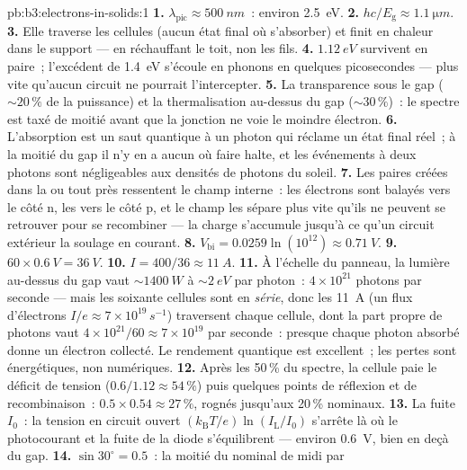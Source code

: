 \begin{solution}{pb:b3:electrons-in-solids:1}
\textbf{1.} $\lambda_{\text{pic}} \approx \qty{500}{nm}$~:
environ \qty{2.5}{eV}.
\textbf{2.} $hc/E_{\text{g}} \approx \qty{1.1}{\micro m}$.
\textbf{3.} Elle traverse les cellules (aucun état final où
s'absorber) et finit en chaleur dans le support --- en réchauffant
le toit, non les fils.
\textbf{4.} $\qty{1.12}{eV}$ survivent en paire~; l'excédent de
\qty{1.4}{eV} s'écoule en phonons en quelques picosecondes --- plus
vite qu'aucun circuit ne pourrait l'intercepter.
\textbf{5.} La transparence sous le gap ($\sim20\,\%$ de la
puissance) et la thermalisation au-dessus du gap
($\sim30\,\%$)~: le spectre est taxé de moitié avant que la jonction
ne voie le moindre électron.
\textbf{6.} L'absorption est un saut quantique à un photon qui
réclame un état final réel~; à la moitié du gap il n'y en a aucun où
faire halte, et les événements à deux photons sont négligeables aux
densités de photons du soleil.
\textbf{7.} Les paires créées dans la  ou tout près
ressentent le champ interne~: les électrons sont balayés vers le
côté n, les  vers le côté p, et le champ les sépare plus vite
qu'ils ne peuvent se retrouver pour se recombiner --- la charge
s'accumule jusqu'à ce qu'un circuit extérieur la soulage en courant.
\textbf{8.} $V_{\text{bi}} = 0.0259\ln(10^{12}) \approx
\qty{0.71}{V}$.
\textbf{9.} $60\times\qty{0.6}{V} = \qty{36}{V}$.
\textbf{10.} $I = 400/36 \approx \qty{11}{A}$.
\textbf{11.} À l'échelle du panneau, la lumière au-dessus du gap
vaut $\sim\qty{1400}{W}$ à $\sim\qty{2}{eV}$ par photon~:
$4\times10^{21}$ photons par seconde --- mais les soixante cellules
sont en \emph{série}, donc les \qty{11}{A} (un flux d'électrons $I/e \approx
7\times10^{19}\,\unit{s^{-1}}$) traversent chaque cellule, dont la
part propre de photons vaut $4\times10^{21}/60 \approx
7\times10^{19}$ par seconde~: presque chaque photon absorbé donne un
électron collecté. Le rendement quantique est excellent~; les pertes
sont énergétiques, non numériques.
\textbf{12.} Après les 50\,\% du spectre, la cellule paie le déficit
de tension ($0.6/1.12 \approx 54\,\%$) puis quelques points de
réflexion et de recombinaison~: $0.5\times0.54 \approx 27\,\%$,
rognés jusqu'aux 20\,\% nominaux.
\textbf{13.} La fuite $I_0$~: la tension en circuit ouvert
$(k_{\text{B}}T/e)\ln(I_{\text{L}}/I_0)$ s'arrête là où le
photocourant et la fuite de la diode s'équilibrent --- environ
\qty{0.6}{V}, bien en deçà du gap.
\textbf{14.} $\sin30^\circ = 0.5$~: la moitié du nominal de midi par

\end{solution}
